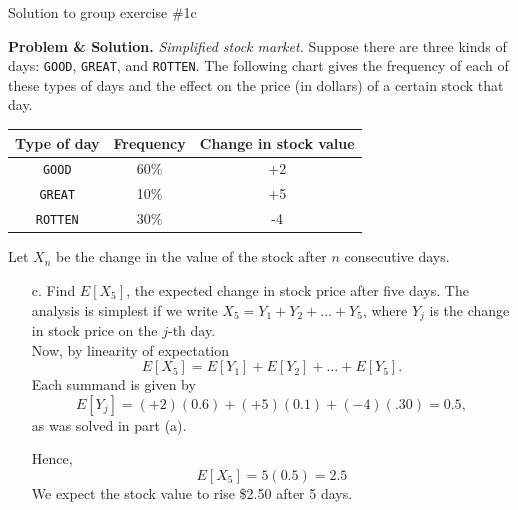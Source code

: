 \documentclass[10pt]{beamer}
\begin{document}
\begin{frame}{Solution to group exercise \#1c}
\footnotesize 

\textbf{Problem \& Solution.} \textit{Simplified stock market.} Suppose there are three kinds of days: \texttt{GOOD}, \texttt{GREAT}, and \texttt{ROTTEN}. The following chart gives the frequency of each of these types of days and the effect on the price (in dollars) of a certain stock that day.
	\vspace{-.2cm}
	\begin{table}[H]
	\begin{tabular}{|c|c|c|}
	\toprule 
	\colorbox{blue!30}{Type of day} & 	\colorbox{blue!30}{Frequency} & \colorbox{blue!30}{Change in stock value} \\
	\midrule 
	\texttt{GOOD} & 60\% & +2 \\
	\texttt{GREAT} & 10\% & +5 \\
	\texttt{ROTTEN} & 30\% & -4 \\
	\bottomrule 
	\end{tabular}
	\end{table}
	\vspace{-.2cm}
	Let $X_n$ be the change in the value of the stock after $n$ consecutive days.
		\vspace{-.2cm}
	 \begin{itemize} \footnotesize 
	\item[c.] Find $E[X_5]$, the expected change in stock price after five days. 
	The analysis is simplest if we write $X_5 = Y_1 + Y_2 + \hdots + Y_5$, where $Y_j$ is the change in stock price on the $j$-th day. \\
	
	Now, by linearity of expectation
	\[E[X_5] = E[Y_1] + E[Y_2] + \hdots + E[Y_5].\] 
	 Each summand is given by
	 \[E[Y_j] = (+2)(0.6) + 	(+5)(0.1) + (-4)(.30) = 0.5, \]
	 as was solved in part (a).
	 
	 Hence, 
	 \[E[X_5] = 5(0.5) = 2.5 \]
	  We expect the stock value to rise \$2.50 after 5 days.
	\end{itemize}
\end{frame}
\end{document}

